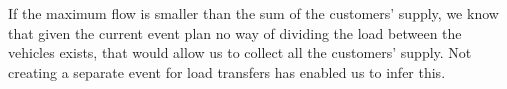If the maximum flow is smaller than the sum of the customers' supply, we know that given the current event plan no way of dividing the load between the vehicles exists, that would allow us to collect all the customers' supply.
Not creating a separate event for load transfers has enabled us to infer this.

























